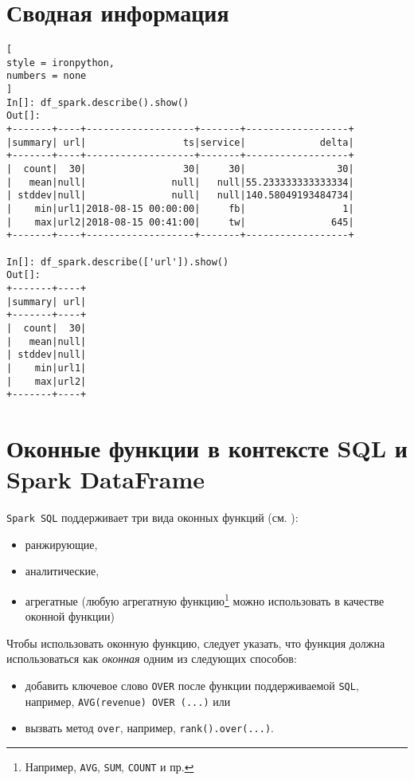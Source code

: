 \documentclass[%
	11pt,
	a4paper,
	utf8,
		]{article}
\begin{document}
\section{Сводная информация}

\begin{lstlisting}[
style = ironpython,
numbers = none
]
In[]: df_spark.describe().show()
Out[]:
+-------+----+-------------------+-------+------------------+
|summary| url|                 ts|service|             delta|
+-------+----+-------------------+-------+------------------+
|  count|  30|                 30|     30|                30|
|   mean|null|               null|   null|55.233333333333334|
| stddev|null|               null|   null|140.58049193484734|
|    min|url1|2018-08-15 00:00:00|     fb|                 1|
|    max|url2|2018-08-15 00:41:00|     tw|               645|
+-------+----+-------------------+-------+------------------+

In[]: df_spark.describe(['url']).show()
Out[]:
+-------+----+
|summary| url|
+-------+----+
|  count|  30|
|   mean|null|
| stddev|null|
|    min|url1|
|    max|url2|
+-------+----+
\end{lstlisting}

\section{Оконные функции в контексте SQL и Spark DataFrame}

\texttt{Spark SQL} поддерживает три вида оконных функций (см. ):

\begin{itemize}
	\item ранжирующие,
	
	\item аналитические,
	
	\item агрегатные (любую агрегатную функцию\footnote{Например, \texttt{AVG}, \texttt{SUM}, \texttt{COUNT} и пр.} можно использовать в качестве оконной функции)
\end{itemize}

Чтобы использовать оконную функцию, следует указать, что функция должна использоваться как \emph{оконная} одним из следующих способов:

\begin{itemize}
	\item добавить ключевое слово \texttt{OVER} после функции поддерживаемой \texttt{SQL}, например, \texttt{AVG(revenue) OVER (...)} или
	
	\item вызвать метод \texttt{over}, например, \texttt{rank().over(...)}.
\end{itemize}
\end{document}
